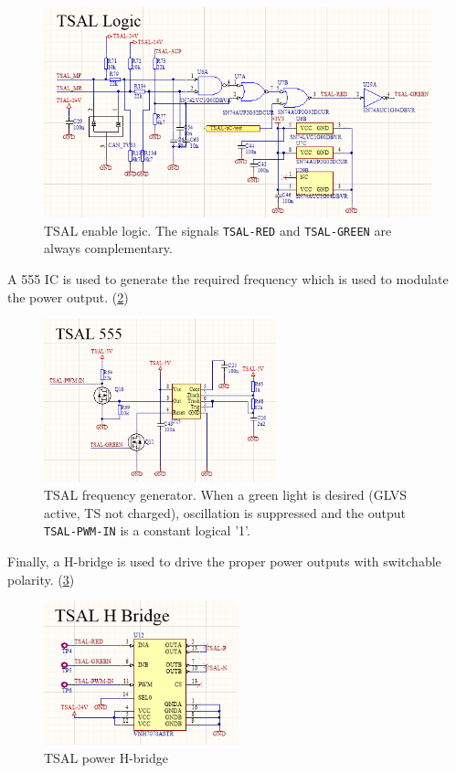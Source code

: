 \begin{figure}[H]
	\centering
	\includegraphics[width=\textwidth]{./img/TSAL-logic.png}
	\caption[TSAL enable logic]{TSAL enable logic. The signals \texttt{TSAL-RED} and \texttt{TSAL-GREEN} are always complementary.}
	\label{fig:TSAL-logic}
\end{figure}

A 555 IC is used to generate the required frequency which is used to modulate the power output. (\ref{fig:TSAL-555})

\begin{figure}[H]
	\centering
	\includegraphics[width=0.6\textwidth]{./img/TSAL-555.png}
	\caption[TSAL frequency generator]{TSAL frequency generator. When a green light is desired (GLVS active, TS not charged), oscillation is suppressed and the output \texttt{TSAL-PWM-IN} is a constant logical '1'.}
	\label{fig:TSAL-555}
\end{figure}

Finally, a H-bridge is used to drive the proper power outputs with switchable polarity. (\ref{fig:TSAL-H-bridge})

\begin{figure}[H]
	\centering
	\includegraphics[width=0.5\textwidth]{./img/TSAL-H-bridge.png}
	\caption{TSAL power H-bridge}
	\label{fig:TSAL-H-bridge}
\end{figure}

